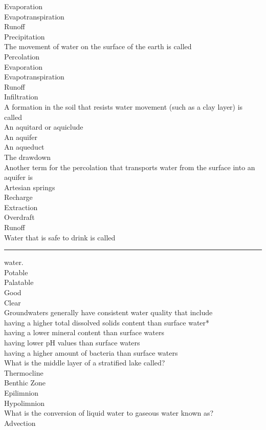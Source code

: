 Evaporation\\
Evapotranspiration\\
Runoff\\
Precipitation\\
The movement of water on the surface of the earth is called\\
Percolation\\
Evaporation\\
Evapotranspiration\\
Runoff\\
Infiltration\\
A formation in the soil that resists water movement (such as a clay layer) is called\\
An aquitard or aquiclude\\
An aquifer\\
An aqueduct\\
The drawdown\\
Another term for the percolation that transports water from the surface into an aquifer is\\
Artesian springs\\
Recharge\\
Extraction\\
Overdraft\\
Runoff\\
Water that is safe to drink is called \rule{2cm}{0.3pt} water.\\
Potable\\
Palatable\\
Good\\
Clear\\
Groundwaters generally have consistent water quality that include\\
having a higher total dissolved solids content than surface water*\\
having a lower mineral content than surface waters\\
having lower pH values than surface waters\\
having a higher amount of bacteria than surface waters\\
What is the middle layer of a stratified lake called?\\
Thermocline\\
Benthic Zone\\
Epilimnion\\
Hypolimnion\\
 What is the conversion of liquid water to gaseous water known as?\\
Advection\\
